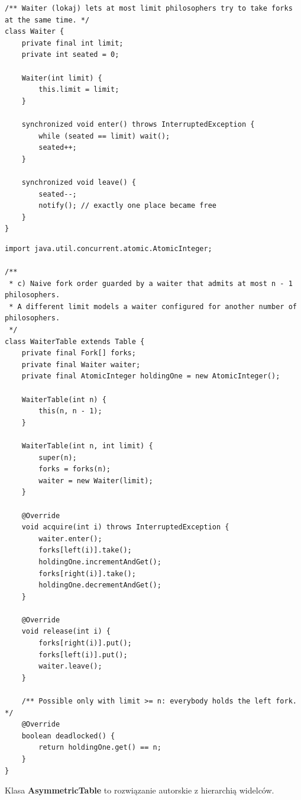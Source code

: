 \documentclass[11pt,a4paper]{article}
\begin{document}
\begin{lstlisting}[caption={Klasa \textbf{Waiter} (\texttt{src/Waiter.java})}]
/** Waiter (lokaj) lets at most limit philosophers try to take forks at the same time. */
class Waiter {
    private final int limit;
    private int seated = 0;

    Waiter(int limit) {
        this.limit = limit;
    }

    synchronized void enter() throws InterruptedException {
        while (seated == limit) wait();
        seated++;
    }

    synchronized void leave() {
        seated--;
        notify(); // exactly one place became free
    }
}
\end{lstlisting}

\begin{lstlisting}[caption={Klasa \textbf{WaiterTable} (\texttt{src/WaiterTable.java})}]
import java.util.concurrent.atomic.AtomicInteger;

/**
 * c) Naive fork order guarded by a waiter that admits at most n - 1 philosophers.
 * A different limit models a waiter configured for another number of philosophers.
 */
class WaiterTable extends Table {
    private final Fork[] forks;
    private final Waiter waiter;
    private final AtomicInteger holdingOne = new AtomicInteger();

    WaiterTable(int n) {
        this(n, n - 1);
    }

    WaiterTable(int n, int limit) {
        super(n);
        forks = forks(n);
        waiter = new Waiter(limit);
    }

    @Override
    void acquire(int i) throws InterruptedException {
        waiter.enter();
        forks[left(i)].take();
        holdingOne.incrementAndGet();
        forks[right(i)].take();
        holdingOne.decrementAndGet();
    }

    @Override
    void release(int i) {
        forks[right(i)].put();
        forks[left(i)].put();
        waiter.leave();
    }

    /** Possible only with limit >= n: everybody holds the left fork. */
    @Override
    boolean deadlocked() {
        return holdingOne.get() == n;
    }
}
\end{lstlisting}

Klasa \textbf{AsymmetricTable} to rozwiązanie autorskie z hierarchią widelców.
\end{document}
